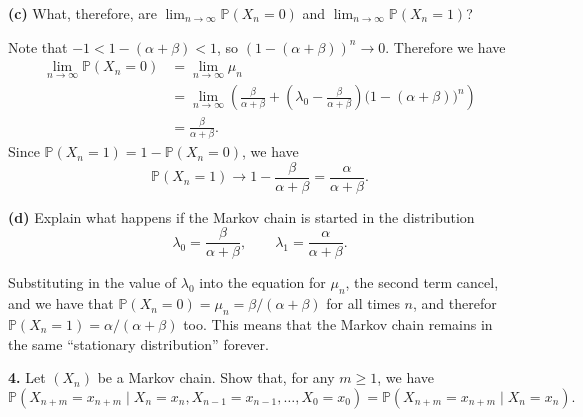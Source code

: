 \documentclass[
  a4paper,
]{article}
\theoremstyle{definition}
\theoremstyle{definition}
\theoremstyle{definition}
\theoremstyle{remark}
\begin{document}
\textbf{(c)} What, therefore, are \(\lim_{n\to\infty} \mathbb P(X_n = 0)\) and \(\lim_{n\to\infty} \mathbb P(X_n = 1)\)?

\begin{myanswers}
Note that \(-1 < 1 - (\alpha + \beta) < 1\), so \((1-(\alpha+\beta))^n \to 0\). Therefore we have
\begin{align*}
\lim_{n\to\infty} \mathbb P(X_n = 0) &= \lim_{n\to\infty} \mu_n \\
&= \lim_{n\to\infty} \left( \frac{\beta}{\alpha+\beta} + \left(\lambda_0 - \frac{\beta}{\alpha+\beta}\right)\big(1-(\alpha+\beta)\big)^n \right) \\
&= \frac{\beta}{\alpha+\beta} .
\end{align*}
Since \(\mathbb P(X_n = 1) = 1- \mathbb P(X_n = 0)\), we have
\[ \mathbb P(X_n = 1) \to 1 - \frac{\beta}{\alpha+\beta} = \frac{\alpha}{\alpha+\beta} . \]

\end{myanswers}

\textbf{(d)} Explain what happens if the Markov chain is started in the distribution
\[ \lambda_0 = \frac{\beta}{\alpha+\beta} , \qquad \lambda_1 = \frac{\alpha}{\alpha+\beta}  . \]

\begin{myanswers}
Substituting in the value of \(\lambda_0\) into the equation for \(\mu_n\), the second term cancel, and we have that \(\mathbb P(X_n = 0) = \mu_n = \beta/(\alpha+\beta)\) for all times \(n\), and therefor \(\mathbb P(X_n = 1) = \alpha/(\alpha+\beta)\) too. This means that the Markov chain remains in the same ``stationary distribution'' forever.

\end{myanswers}

\textbf{4.} Let \((X_n)\) be a Markov chain. Show that, for any \(m \geq 1\), we have
\[ \mathbb P(X_{n+m} = x_{n+m} \mid X_n = x_n, X_{n-1} = x_{n-1}, \dots, X_0 = x_0)  =  \mathbb P(X_{n+m} = x_{n+m} \mid X_n = x_n) . \]
\end{document}
